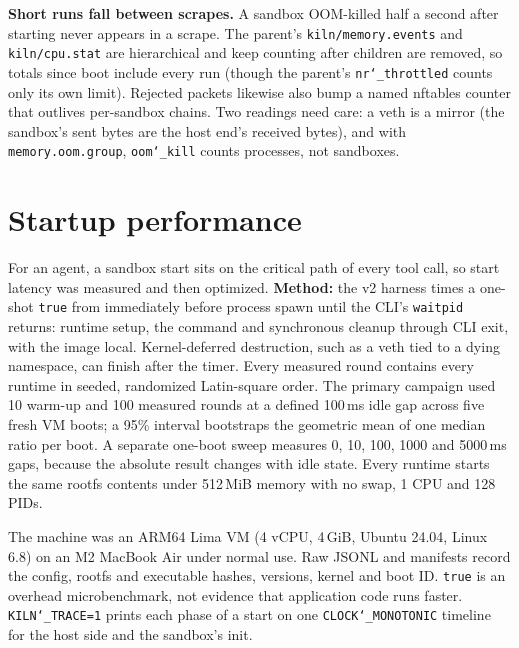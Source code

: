 \documentclass[10pt,letterpaper]{article}
\newcommand{\code}[1]{\texttt{#1}}
\newcommand{\us}{\char`\_}
\begin{document}
\textbf{Short runs fall between scrapes.} A sandbox OOM-killed half a second after
starting never appears in a scrape. The parent's \code{kiln/memory.events} and
\code{kiln/cpu.stat} are hierarchical and keep counting after children are
removed, so totals since boot include every run (though the parent's
\code{nr\us{}throttled} counts only its own limit). Rejected packets likewise also
bump a named nftables counter that outlives per-sandbox chains. Two readings need
care: a veth is a mirror (the sandbox's sent bytes are the host end's received
bytes), and with \code{memory.oom.group}, \code{oom\us{}kill} counts processes,
not sandboxes.

\section{Startup performance}
\label{sec:perf}

For an agent, a sandbox start sits on the critical path of every tool call, so
start latency was measured and then optimized. \textbf{Method:} the v2 harness
times a one-shot \code{true} from immediately before process spawn until the
CLI's \code{waitpid} returns: runtime setup, the command and synchronous cleanup
through CLI exit, with the image local. Kernel-deferred destruction, such as a
veth tied to a dying namespace, can finish after the timer. Every measured
round contains every runtime in seeded,
randomized Latin-square order. The primary campaign used 10 warm-up and 100
measured rounds at a defined 100\,ms idle gap across five fresh VM boots; a
95\% interval bootstraps the geometric mean of one median ratio per boot. A
separate one-boot sweep measures 0, 10, 100, 1000 and 5000\,ms gaps, because
the absolute result changes with idle state. Every runtime starts the same
rootfs contents under 512\,MiB memory with no swap, 1 CPU and 128 PIDs.

The machine was an ARM64 Lima VM (4 vCPU, 4\,GiB, Ubuntu 24.04, Linux 6.8) on
an M2 MacBook Air under normal use. Raw JSONL and manifests record the config,
rootfs and executable hashes, versions, kernel and boot ID. \code{true} is an
overhead microbenchmark, not evidence that application code runs faster.
\code{KILN\us{}TRACE=1} prints each phase of a start on one
\code{CLOCK\us{}MONOTONIC} timeline for the host side and the sandbox's init.
\end{document}
